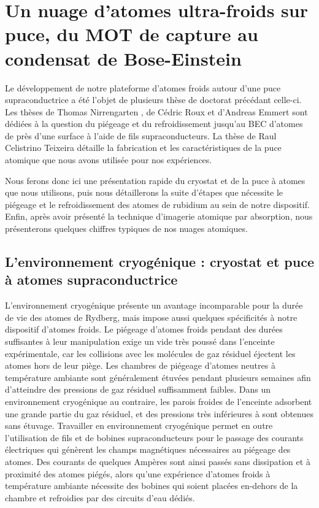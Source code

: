 \section{Un nuage d'atomes ultra-froids sur puce, du MOT de capture au condensat de Bose-Einstein}

\noindent Le développement de notre plateforme d'atomes froids autour d'une puce supraconductrice a été l'objet de plusieurs thèse de doctorat précédant celle-ci.
Les thèses de Thomas Nirrengarten \cite{PHD_NIRRENGARTEN}, de Cédric Roux \cite{PHD_ROUX} et d'Andreas Emmert \cite{PHD_EMMERT} sont dédiées à la question du piégeage et du refroidissement jusqu'au BEC d'atomes de  près d'une surface à l'aide de fils supraconducteurs.
La thèse de Raul Celistrino Teixeira \cite{PHD_CELISTRINO} détaille la fabrication et les caractéristiques de la puce atomique que nous avons utilisée pour nos expériences.

Nous ferons donc ici une présentation rapide du cryostat et de la puce à atomes que nous utilisons, puis nous détaillerons la suite d'étapes que nécessite le piégeage et le refroidissement des atomes de rubidium au sein de notre dispositif.
Enfin, après avoir présenté la technique d'imagerie atomique par absorption, nous présenterons quelques chiffres typiques de nos nuages atomiques.


	\subsection{L'environnement cryogénique : cryostat et puce à atomes supraconductrice}\label{subsec:cryopuce}
	
\noindent L'environnement cryogénique présente un avantage incomparable pour la durée de vie des atomes de Rydberg, mais impose aussi quelques spécificités à notre dispositif d'atomes froids.
Le piégeage d'atomes froids pendant des durées suffisantes à leur manipulation exige un vide très poussé dans l'enceinte expérimentale, car les collisions avec les molécules de gaz résiduel éjectent les atomes hors de leur piège.
Les chambres de piégeage d'atomes neutres à température ambiante sont généralement étuvées pendant plusieurs semaines afin d'atteindre des pressions de gaz résiduel suffisamment faibles.
Dans un environnement cryogénique au contraire, les parois froides de l'enceinte adsorbent une grande partie du gaz résiduel, et des pressions très inférieures à  sont obtenues sans étuvage.
Travailler en environnement cryogénique permet en outre l'utilisation de fils et de bobines supraconducteurs pour le passage des courants électriques qui génèrent les champs magnétiques nécessaires au piégeage des atomes.
Des courants de quelques Ampères sont ainsi passés sans dissipation et à proximité des atomes piégés, alors qu'une expérience d'atomes froids à température ambiante nécessite des bobines qui soient placées en-dehors de la chambre et refroidies par des circuits d'eau dédiés.

